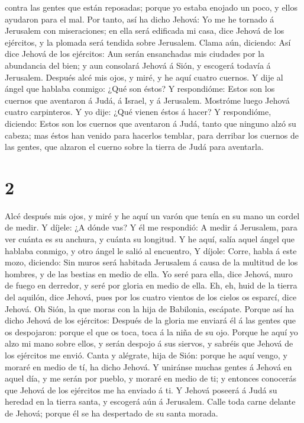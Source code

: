 contra las gentes que están reposadas; porque yo estaba enojado un poco,
y ellos ayudaron para el mal.  Por tanto, así ha dicho
Jehová: Yo me he tornado á Jerusalem con miseraciones; en ella será
edificada mi casa, dice Jehová de los ejércitos, y la plomada será
tendida sobre Jerusalem.  Clama aún, diciendo: Así dice
Jehová de los ejércitos: Aun serán ensanchadas mis ciudades por la
abundancia del bien; y aun consolará Jehová á Sión, y escogerá todavía á
Jerusalem.  Después alcé mis ojos, y miré, y he aquí
cuatro cuernos.  Y dije al ángel que hablaba conmigo:
¿Qué son éstos? Y respondióme: Estos son los cuernos que aventaron á
Judá, á Israel, y á Jerusalem.  Mostróme luego Jehová
cuatro carpinteros.  Y yo dije: ¿Qué vienen éstos á
hacer? Y respondióme, diciendo: Estos son los cuernos que aventaron á
Judá, tanto que ninguno alzó su cabeza; mas éstos han venido para
hacerlos temblar, para derribar los cuernos de las gentes, que alzaron
el cuerno sobre la tierra de Judá para aventarla.

\hypertarget{section-1}{%
\section{2}\label{section-1}}

 Alcé después mis ojos, y miré y he aquí un varón que
tenía en su mano un cordel de medir.  Y díjele: ¿A dónde
vas? Y él me respondió: A medir á Jerusalem, para ver cuánta es su
anchura, y cuánta su longitud.  Y he aquí, salía aquel
ángel que hablaba conmigo, y otro ángel le salió al encuentro,
 Y díjole: Corre, habla á este mozo, diciendo: Sin muros
será habitada Jerusalem á causa de la multitud de los hombres, y de las
bestias en medio de ella.  Yo seré para ella, dice Jehová,
muro de fuego en derredor, y seré por gloria en medio de ella.
 Eh, eh, huid de la tierra del aquilón, dice Jehová, pues
por los cuatro vientos de los cielos os esparcí, dice Jehová.
 Oh Sión, la que moras con la hija de Babilonia, escápate.
 Porque así ha dicho Jehová de los ejércitos: Después de
la gloria me enviará él á las gentes que os despojaron: porque el que os
toca, toca á la niña de su ojo.  Porque he aquí yo alzo mi
mano sobre ellos, y serán despojo á sus siervos, y sabréis que Jehová de
los ejércitos me envió.  Canta y alégrate, hija de Sión:
porque he aquí vengo, y moraré en medio de tí, ha dicho Jehová.
 Y uniránse muchas gentes á Jehová en aquel día, y me
serán por pueblo, y moraré en medio de ti; y entonces conocerás que
Jehová de los ejércitos me ha enviado á ti.  Y Jehová
poseerá á Judá su heredad en la tierra santa, y escogerá aún á
Jerusalem.  Calle toda carne delante de Jehová; porque él
se ha despertado de su santa morada.

